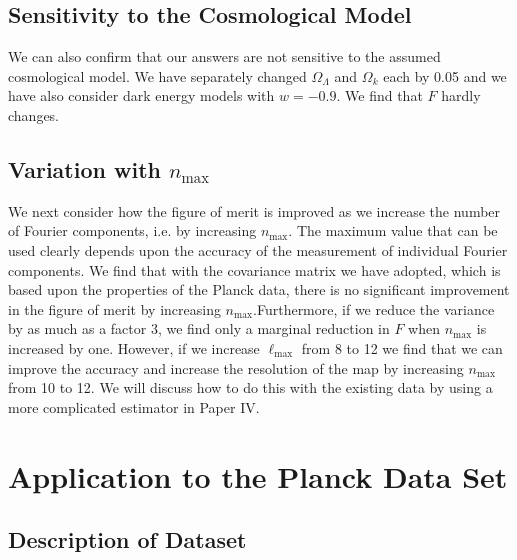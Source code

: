 \documentclass[useAMS,usenatbib,a4paper]{mn2e}
\begin{document}
\subsection{Sensitivity to the Cosmological Model}

We can also confirm that our answers are not sensitive to the assumed
cosmological model. We have separately changed $\Omega_\Lambda$ and
$\Omega_k$ each by  0.05 and we have also consider dark energy models
with $w=-0.9$. We find that $F$ hardly changes.

\subsection{Variation with $n_\mathrm{max}$}

We next consider how the figure of merit is improved as we increase
the number of Fourier components, i.e. by increasing $n_\mathrm{max}$.
The maximum value that can be used clearly depends upon the accuracy
of the measurement of individual Fourier components. We find that with
the covariance matrix we have adopted, which is based upon the
properties of the Planck data, there is no significant improvement in
the figure of merit by increasing $n_\mathrm{max}$.Furthermore, if we
reduce the variance by as much as a factor 3, we find only a marginal
reduction in $F$ when $n_\mathrm{max}$ is increased by one. However,
if we increase $\ell_\mathrm{max}$ from 8 to 12 we find that we can
improve the accuracy and increase the resolution of the map by
increasing $n_\mathrm{max}$ from 10 to 12. We will discuss how to do
this with the existing data by using a more complicated estimator in
Paper IV.


\section{Application to the Planck Data Set}

\subsection{Description of Dataset}
\end{document}
